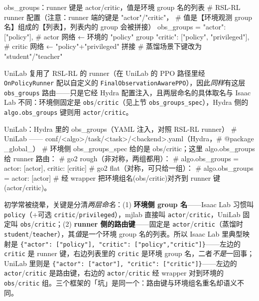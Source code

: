 \begin{codebox}[Python]{obs\_groups：runner 键是 actor/critic，值是环境 group 名的列表}
# RSL-RL runner 配置（注意：runner 端的键是 "actor"/"critic"，
# 值是【环境观测 group 名】组成的【列表】，列表内的 group 会被拼接）
obs_groups = {
    "actor":  ["policy"],               # actor 网络 ← 环境的 "policy" group
    "critic": ["policy", "privileged"], # critic 网络 ← "policy"+"privileged" 拼接
}
# 蒸馏场景下键改为 "student"/"teacher"
\end{codebox}

UniLab 复用了 RSL-RL 的 runner（在 UniLab 的 PPO 路径里经 \verb|OnPolicyRunner| 配以自定义的 \verb|FinalObservationAwarePPO|），因此\emph{同样}有这层 \verb|obs_groups| 路由——只是它经 Hydra 配置注入，且两层命名的具体取名与 Isaac Lab 不同：环境侧固定是 \verb|obs|/\verb|critic|（见上节 \verb|obs_groups_spec|），Hydra 侧的 \verb|algo.obs_groups| 键则用 \verb|actor|/\verb|critic|。

\begin{codebox}[Python]{UniLab：Hydra 里的 obs\_groups（YAML 注入，对照 RSL-RL runner）}
# UniLab —— conf/<algo>/task/<task>/<backend>.yaml（Hydra，# @package _global_）
# 环境侧 obs_groups_spec 给的是 obs/critic；这里 algo.obs_groups 给 runner 路由：
# go2 rough（非对称，两组都用）：
#   algo.obs_groups = {actor: [actor], critic: [critic]}
# go2 flat（对称，可只给一组）：
#   algo.obs_groups = {actor: [actor]}
# 经 wrapper 把环境组名(obs/critic)对齐到 runner 键(actor/critic)。
\end{codebox}

\begin{insight}\label{ins:rlmc-naming}
初学常被绕晕，关键是分清\emph{两层命名}：(1) \textbf{环境侧 group 名}——Isaac Lab 习惯叫 \verb|policy|（+可选 \verb|critic|/\verb|privileged|），mjlab 直接叫 \verb|actor|/\verb|critic|，UniLab 固定叫 \verb|obs|/\verb|critic|；(2) \textbf{runner 侧的路由键}——固定是 \verb|actor|/\verb|critic|（蒸馏时 \verb|student|/\verb|teacher|），其\emph{值}是一个环境 group 名的列表。所以 Isaac Lab 里典型映射是 \verb|{"actor": ["policy"], "critic": ["policy","critic"]}|——左边的 \verb|critic| 是 runner 键，右边列表里的 \verb|critic| 是环境 group 名，二者\emph{不是}一回事；UniLab 里则是 \verb|{"actor": ["actor"], "critic": ["critic"]}|——左边的 \verb|actor|/\verb|critic| 是路由键，右边的 \verb|actor|/\verb|critic| 经 wrapper 对到环境的 \verb|obs|/\verb|critic| 组。三个框架的「坑」是同一个：路由键与环境组名重名却语义不同。
\end{insight}

